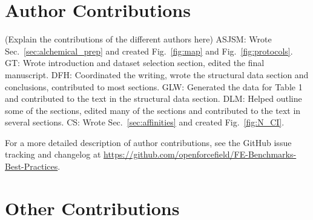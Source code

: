 \documentclass[9pt,bestpractices]{livecoms}
\newcommand{\githubrepository}{\url{https://github.com/openforcefield/FE-Benchmarks-Best-Practices}}  %
\begin{document}
\section{Author Contributions}
%

(Explain the contributions of the different authors here)
ASJSM: Wrote Sec.~\ref{sec:alchemical_prep} and created Fig.~\ref{fig:map} and Fig.~\ref{fig:protocols}. 
GT: Wrote introduction and dataset selection section, edited the final manuscript.
DFH: Coordinated the writing, wrote the structural data section and conclusions, contributed to most sections.
GLW: Generated the data for Table 1 and contributed to the text in the structural data section.
DLM: Helped outline some of the sections, edited many of the sections and contributed to the text in several sections.
CS: Wrote Sec.~\ref{sec:affinities} and created Fig.~\ref{fig:N_CI}.

For a more detailed description of author contributions,
see the GitHub issue tracking and changelog at \githubrepository.


\section{Other Contributions}
%
\end{document}
